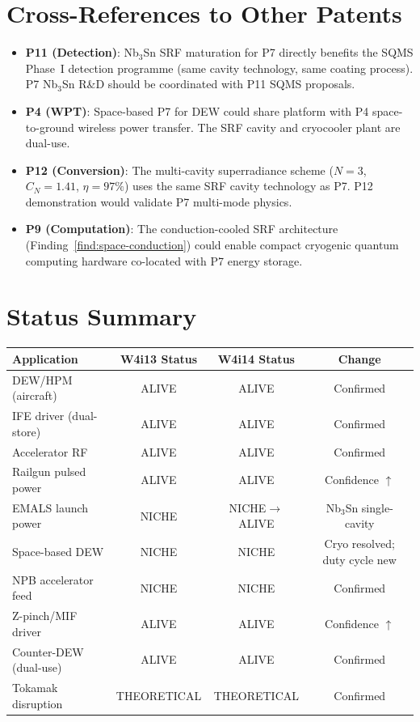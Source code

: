 \documentclass[11pt]{article}
\begin{document}
\section{Cross-References to Other Patents}

\begin{itemize}[nosep]
  \item \textbf{P11 (Detection)}: Nb$_3$Sn SRF maturation for P7
    directly benefits the SQMS Phase~I detection programme (same
    cavity technology, same coating process). P7 Nb$_3$Sn R\&D
    should be coordinated with P11 SQMS proposals.
  \item \textbf{P4 (WPT)}: Space-based P7 for DEW could share
    platform with P4 space-to-ground wireless power transfer.
    The SRF cavity and cryocooler plant are dual-use.
  \item \textbf{P12 (Conversion)}: The multi-cavity superradiance
    scheme ($N = 3$, $C_N = 1.41$, $\eta = 97\%$) uses the same
    SRF cavity technology as P7. P12 demonstration would validate
    P7 multi-mode physics.
  \item \textbf{P9 (Computation)}: The conduction-cooled SRF
    architecture (Finding~\ref{find:space-conduction}) could enable
    compact cryogenic quantum computing hardware co-located with
    P7 energy storage.
\end{itemize}

\section{Status Summary}

\begin{center}
\begin{tabular}{lccc}
\toprule
Application & W4i13 Status & W4i14 Status & Change \\
\midrule
DEW/HPM (aircraft) & ALIVE & ALIVE & Confirmed \\
IFE driver (dual-store) & ALIVE & ALIVE & Confirmed \\
Accelerator RF & ALIVE & ALIVE & Confirmed \\
Railgun pulsed power & ALIVE & ALIVE & Confidence $\uparrow$ \\
EMALS launch power & NICHE & NICHE$\to$ALIVE & Nb$_3$Sn single-cavity \\
Space-based DEW & NICHE & NICHE & Cryo resolved; duty cycle new \\
NPB accelerator feed & NICHE & NICHE & Confirmed \\
Z-pinch/MIF driver & ALIVE & ALIVE & Confidence $\uparrow$ \\
Counter-DEW (dual-use) & ALIVE & ALIVE & Confirmed \\
Tokamak disruption & THEORETICAL & THEORETICAL & Confirmed \\
\bottomrule
\end{tabular}
\end{center}
\end{document}
